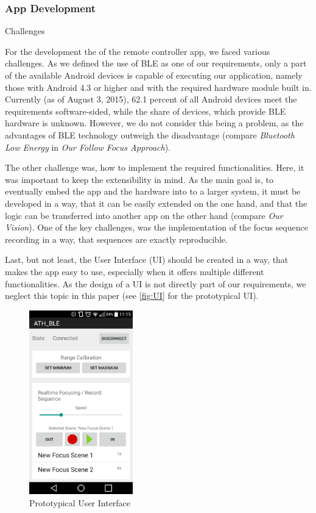 \documentclass{sigchi}
\begin{document}
\subsubsection{App Development}
Challenges

For the development the of the remote controller app, we faced various challenges. As we defined the use of BLE as one of our requirements, only a part of the available Android devices is capable of executing our application, namely those with Android 4.3 or higher and with the required hardware module built in. Currently (as of August 3, 2015), 62.1 percent of all Android devices meet the requirements software-sided, while the share of devices, which provide BLE hardware is unknown. \cite{devand} However, we do not consider this being a problem, as the advantages of BLE technology outweigh the disadvantage (compare \textit{Bluetooth Low Energy} in \textit{Our Follow Focus Approach}).

The other challenge was, how to implement the required functionalities. Here, it was important to keep the extensibility in mind. As the main goal is, to eventually embed the app and the hardware into to a larger system, it must be developed in a way, that it can be easily extended on the one hand, and that the logic can be transferred into another app on the other hand (compare \textit{Our Vision}). One of the key challenges, was the implementation of the focus sequence recording in a way, that sequences are exactly reproducible. 

Last, but not least, the User Interface (UI) should be created in a way, that makes the app easy to use, especially when it offers multiple different functionalities. As the design of a UI is not directly part of our requirements, we neglect this topic in this paper (see \autoref{fig:UI} for the prototypical UI). 

\begin{figure}
  \center
  \includegraphics[width=0.4\textwidth]{ui.png}
  \caption{Prototypical User Interface}
  \label{fig:UI}
\end{figure} 
\end{document}
